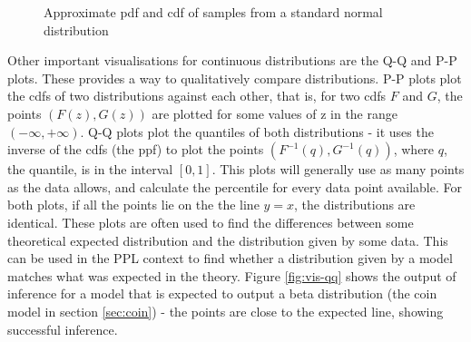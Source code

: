 \begin{figure}[!htb]
	\centering
	\qquad
	\caption{Approximate pdf and cdf of samples from a standard normal distribution}
	\label{fig:vis-norm}
\end{figure}
	
Other important visualisations for continuous distributions are the Q-Q and P-P plots. These provides a way to qualitatively compare distributions. P-P plots plot the cdfs of two distributions against each other, that is, for two cdfs $F$ and $G$, the points $(F(z), G(z))$ are plotted for some values of z in the range $(-\infty,+\infty)$. Q-Q plots plot the quantiles of both distributions - it uses the inverse of the cdfs (the ppf) to plot the points $(F^{-1}(q), G^{-1}(q))$, where $q$, the quantile, is in the interval $[0,1]$. This plots will generally use as many points as the data allows, and calculate the percentile for every data point available. For both plots, if all the points lie on the the line $y=x$, the distributions are identical. These plots are often used to find the differences between some theoretical expected distribution and the distribution given by some data. This can be used in the PPL context to find whether a distribution given by a model matches what was expected in the theory. Figure \ref{fig:vis-qq} shows the output of inference for a model that is expected to output a beta distribution (the coin model in section \ref{sec:coin}) - the points are close to the expected line, showing successful inference.

